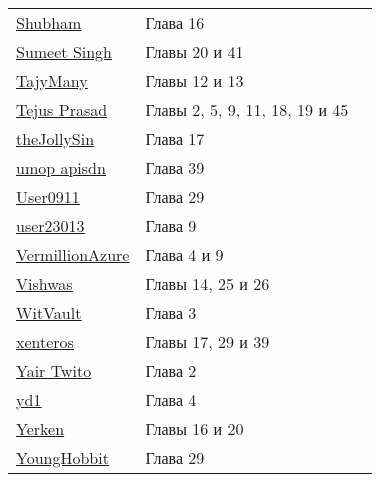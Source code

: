 \begin{tabular}{p{50mm}ll}
\href{https://stackoverflow.com/users/3160529/}{\underline{Shubham}} & Глава 16 \\
\href{https://stackoverflow.com/users/4391177/}{\underline{Sumeet Singh}} & Главы 20 и 41 \\
\href{https://stackoverflow.com/users/1524047/}{\underline{TajyMany}} & Главы 12 и 13 \\
\href{https://stackoverflow.com/users/3409405/}{\underline{Tejus Prasad}} & Главы 2, 5, 9, 11, 18, 19 и 45 \\
\href{https://stackoverflow.com/users/1287593/}{\underline{theJollySin}} & Глава 17 \\
\href{https://stackoverflow.com/users/7533465/}{\underline{umop apisdn}} & Глава 39 \\
\href{https://stackoverflow.com/users/1796837/}{\underline{User0911}} & Глава 29 \\
\href{https://stackoverflow.com/users/3998030/}{\underline{user23013}} & Глава 9 \\
\href{https://stackoverflow.com/users/3819850/}{\underline{VermillionAzure}} & Глава 4 и 9 \\
\href{https://stackoverflow.com/users/3870293/}{\underline{Vishwas}} & Главы 14, 25 и 26 \\
\href{https://stackoverflow.com/users/1745409/}{\underline{WitVault}} & Глава 3 \\
\href{https://stackoverflow.com/users/4723795/}{\underline{xenteros}} & Главы 17, 29 и 39 \\
\href{https://stackoverflow.com/users/6709421/}{\underline{Yair Twito}} & Глава 2 \\
\href{https://stackoverflow.com/users/6952491/}{\underline{yd1}} & Глава 4 \\
\href{https://stackoverflow.com/users/1597656/}{\underline{Yerken}} & Главы 16 и 20 \\
\href{https://stackoverflow.com/users/2254048/}{\underline{YoungHobbit}} & Глава 29 \\
\end{tabular}
